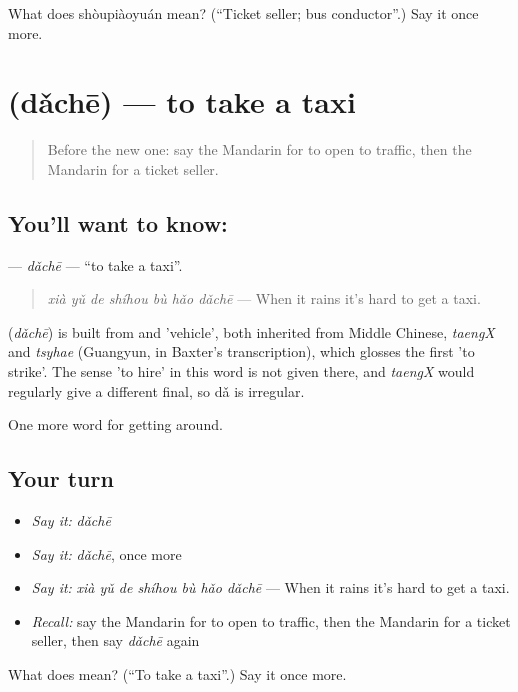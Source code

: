\begin{tcolorbox}[breakable,colback=teal!4,colframe=teal!35!black,title={Before you move on}]
What does shòupiàoyuán mean? (\textquotedblleft{}Ticket seller; bus conductor\textquotedblright{}.) Say it once more.
\end{tcolorbox}
\section[\texorpdfstring{\zh{打车} (dǎchē)}{打车 (dǎchē)}]{ (dǎchē) — to take a taxi}

\label{lesson:ZH-C409-dache}



\begin{quote}
Before the new one: say the Mandarin for to open to traffic, then the Mandarin for a ticket seller.
\end{quote}

\subsection*{You'll want to know: }
\textbf{} — \emph{dǎchē} — \textquotedblleft{}to take a taxi\textquotedblright{}.

\begin{quote}
\textbf{} \emph{xià yǔ de shíhou bù hǎo dǎchē} — When it rains it's hard to get a taxi.
\end{quote}

\begin{cousinweb}
\textbf{} (\emph{dǎchē}) is built from  and  'vehicle', both inherited from Middle Chinese, \emph{taengX} and \emph{tsyhae} (Guangyun, in Baxter's transcription), which glosses the first 'to strike'. The sense 'to hire' in this word is not given there, and \emph{taengX} would regularly give a different final, so dǎ is irregular.
\end{cousinweb}

\begin{grammarlens}[title={What you've built}]
One more word for getting around.
\end{grammarlens}

\subsection*{Your turn}
\begin{itemize}
\raggedright
  \item \emph{Say it:} \emph{dǎchē}
  \item \emph{Say it:} \emph{dǎchē}, once more
  \item \emph{Say it:} \emph{xià yǔ de shíhou bù hǎo dǎchē} — When it rains it's hard to get a taxi.
  \item \emph{Recall:} say the Mandarin for to open to traffic, then the Mandarin for a ticket seller, then say \emph{dǎchē} again
\end{itemize}

\begin{tcolorbox}[breakable,colback=teal!4,colframe=teal!35!black,title={Before you move on}]
What does  mean? (\textquotedblleft{}To take a taxi\textquotedblright{}.) Say it once more.
\end{tcolorbox}

